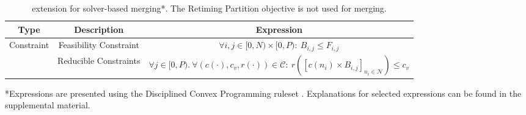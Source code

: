 \begin{table*}
	\begin{tabular}{c | c | c}
		\textbf{Type} & \textbf{Description} & \textbf{Expression}\\\hline
		Constraint & Feasibility Constraint & $ \forall i, j \in [0, N) \times [0, P):\ B_{i, j} \le F_{i, j}$\\
		& Reducible Constraints & $\forall j \in [0, P).\ \forall (c(\cdot), c_v, r(\cdot)) \in \mathcal{C}:\ r([c(n_i) \times B_{i, j}]_{n_i \in \mathcal{N}}) \le c_v$\\
	\end{tabular}
  \caption{ extension for solver-based merging*. The Retiming Partition objective is not used for merging.}
	\label{tab:merge-eqns}
  \scriptsize
  \raggedright
  \vspace{-0.3cm}
  *Expressions are presented using the Disciplined Convex Programming ruleset \cite{DCP, DCP-online}. Explanations for selected expressions can be found in the supplemental material.
\end{table*}

